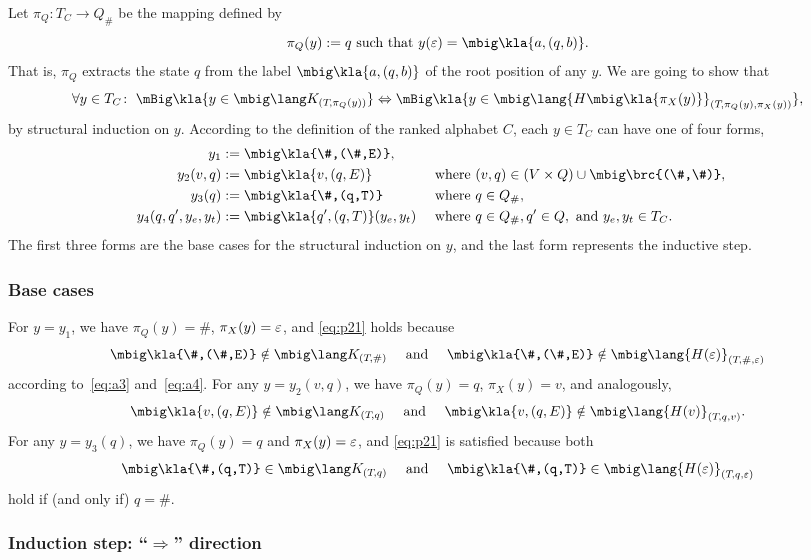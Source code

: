 Let $\pi_Q: T_C\to Q_\#$ be the mapping defined by
\[
 \pi_Q(y) := q \text{ such that } y(\eps) = \mbig\kla{a,(q,b)}.
\]
That is, $\pi_Q$ extracts the state $q$ from the label $\mbig\kla{a,(q,b)}$
of the root position of any $y$. We are going to show that
\begin{equation}\label{eq:p21}
 \forall y\in T_C\colon\;
 \mBig\kla{y\in\mbig\lang K_{(T\!,\pi_Q(y))}}
 \Leftrightarrow
 \mBig\kla{y\in\mbig\lang{H\mbig\kla{\pi_X(y)}}_{(T\!,\pi_Q(y),\pi_X(y))}},
\end{equation}
by structural induction on $y$. According to the definition of the ranked
alphabet $C$, each $y\in T_C$ can have one of four forms,
\begin{align*}
 y_1 &:= \mbig\kla{\#,(\#,E)}, \\
 y_2(v,q) &:= \mbig\kla{v,(q,E)} &&\text{ where } (v,q) \in (V\times Q) \cup \mbig\brc{(\#,\#)}, \\
 y_3(q) &:= \mbig\kla{\#,(q,T)} &&\text{ where } q\in Q_\#, \\
 y_4(q,q',y_e,y_t) &:= \mbig\kla{q',(q,T)}(y_e,y_t) &&\text{ where } q\in Q_\#, q'\in Q, \text{ and } y_e,y_t\in T_C.
\end{align*}
The first three forms are the base cases for the structural induction on $y$,
and the last form represents the inductive step.

\subsubsection*{Base cases}

For $y=y_1$, we have $\pi_Q(y) = \#$, $\pi_X(y) = \varepsilon$, and \eqref{eq:p21} holds
because
\[
 \mbig\kla{\#,(\#,E)} \notin \mbig\lang K_{(T\!,\#)}
 \quad\text{ and }\quad
 \mbig\kla{\#,(\#,E)} \notin \mbig\lang{H(\eps)}_{(T\!,\#,\eps)}
\]
according to~\eqref{eq:a3} and~\eqref{eq:a4}. For any $y=y_2(v,q)$, we have
$\pi_Q(y)=q$, $\pi_X(y)=v$, and analogously,
\[
 \mbig\kla{v,(q,E)} \notin \mbig\lang K_{(T\!,q)}
 \quad\text{ and }\quad
 \mbig\kla{v,(q,E)} \notin \mbig\lang{H(v)}_{(T\!,q,v)}.
\]
For any $y=y_3(q)$, we have $\pi_Q(y) = q$ and $\pi_X(y)=\varepsilon$, and \eqref{eq:p21} is
satisfied because both
\[
 \mbig\kla{\#,(q,T)} \in \mbig\lang K_{(T\!,q)}
 \quad\text{ and }\quad
 \mbig\kla{\#,(q,T)} \in \mbig\lang{H(\eps)}_{(T\!,q,\eps)}
\]
hold if (and only if) $q=\#$.

\subsubsection*{Induction step: ``$\Rightarrow$'' direction}

